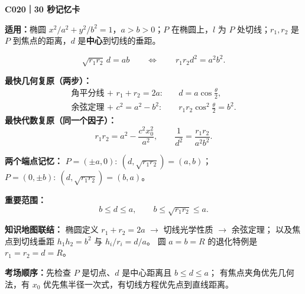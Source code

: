\begin{summarybox}
\textbf{\textcolor{CSummary}{C020｜30 秒记忆卡}}

\textbf{适用：}椭圆 $x^2/a^2+y^2/b^2=1$，$a>b>0$；$P$ 在椭圆上，$l$ 为 $P$ 处切线；$r_1,r_2$ 是 $P$ 到焦点的距离，$d$ 是\textbf{中心}到切线的垂距。

\[
\boxed{\sqrt{r_1r_2}\,d=ab}
\qquad\Longleftrightarrow\qquad
\boxed{r_1r_2d^2=a^2b^2}.
\]

\textbf{最快几何复原（两步）：}
\[
\begin{aligned}
\text{角平分线 + }r_1+r_2=2a:
&\quad d=a\cos\frac\theta2,\\
\text{余弦定理 + }c^2=a^2-b^2:
&\quad r_1r_2\cos^2\frac\theta2=b^2.
\end{aligned}
\]
\textbf{最快代数复原（同一个因子）：}
\[
\boxed{r_1r_2=a^2-\frac{c^2x_0^2}{a^2}},\qquad
\boxed{\frac1{d^2}=\frac{r_1r_2}{a^2b^2}}.
\]

\textbf{两个端点记忆：}
$P=(\pm a,0):\ (d,\sqrt{r_1r_2})=(a,b)$；
$P=(0,\pm b):\ (d,\sqrt{r_1r_2})=(b,a)$。

\textbf{重要范围：}
\[
\boxed{b\le d\le a},\qquad
\boxed{b\le\sqrt{r_1r_2}\le a}.
\]

\textbf{知识地图联结：}
椭圆定义 $r_1+r_2=2a$ $\to$ 切线光学性质 $\to$ 余弦定理；
以及焦点到切线垂距 $h_1h_2=b^2$ 与 $h_i/r_i=d/a$。
圆 $a=b=R$ 的退化特例是 $r_1=r_2=d=R$。

\textbf{考场顺序：}先检查 $P$ 是切点、$d$ 是中心距离且 $b\le d\le a$；
有焦点夹角优先几何法，有 $x_0$ 优先焦半径一次式，有切线方程优先点到直线距离。
\end{summarybox}
